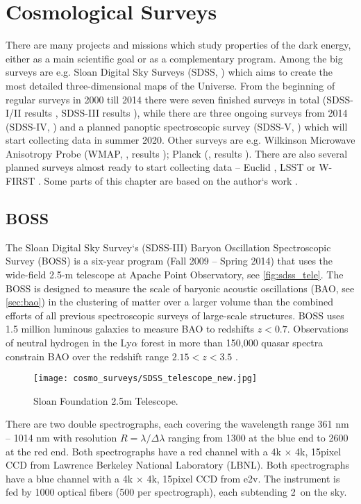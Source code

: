 \chapter{Cosmological Surveys}
\label{chpt:cosmo_surveys}
There are many projects and missions which study properties of the dark energy, either as a main scientific goal or as a complementary program. Among the big surveys are e.g. Sloan Digital Sky Surveys (SDSS, \cite{SDSS}) which aims to create the most detailed three-dimensional maps of the Universe. From the beginning of regular surveys in 2000 till 2014 there were seven finished surveys in total (SDSS-I/II results \cite{SDSS_I_II}, SDSS-III results \cite{BOSS_results}), while there are three ongoing surveys from 2014 (SDSS-IV, \cite{2017AJ....154...28B}) and a planned panoptic spectroscopic survey (SDSS-V, \cite{2017arXiv171103234K}) which will start collecting data in summer 2020. Other surveys are e.g. Wilkinson Microwave Anisotropy Probe (WMAP, \cite{WMAP}, results \cite{WMAP_results}); Planck (\cite{planck}, results \cite{planck_cosm}). There are also several planned surveys almost ready to start collecting data -- Euclid \parencite{euclid}, LSST \parencite{lsst} or W-FIRST \parencite{WFIRST_report}. Some parts of this chapter are based on the author`s work \textcite{mastersthesis_vrastil}.
\section{BOSS}
The Sloan Digital Sky Survey`s (SDSS-III) Baryon Oscillation Spectroscopic Survey (BOSS) is a six-year program (Fall 2009 -- Spring 2014)  that uses the wide-field 2.5-m telescope at Apache Point Observatory, see \autoref{fig:sdss_tele}. The BOSS is designed to measure the scale of baryonic acoustic oscillations (BAO, see \autoref{sec:bao}) in the clustering of matter over a larger volume than the combined efforts of all previous spectroscopic surveys of large-scale structures. BOSS uses 1.5 million luminous galaxies to measure BAO to redshifts $z<0.7$. Observations of neutral hydrogen in the Ly$\alpha$ forest in more than 150,000 quasar spectra constrain BAO over the redshift range $2.15 < z < 3.5$ \cite{BOSS}.
\begin{figure}[tb]
    \centering
    \texttt{[image: cosmo\_surveys/SDSS\_telescope\_new.jpg]}
    \caption{Sloan Foundation 2.5m Telescope.}
    \label{fig:sdss_tele}
\end{figure}

There are two double spectrographs, each covering the wavelength range 361 nm -- 1014 nm with resolution $R=\lambda/\Delta\lambda$ ranging from 1300 at the blue end to 2600 at the red end.  Both spectrographs have a red channel with a 4k $\times$ 4k, 15\um  pixel CCD from Lawrence Berkeley National Laboratory (LBNL). Both spectrographs have a blue channel with a 4k $\times$ 4k, 15\um  pixel CCD from  e2v. The instrument is fed by 1000 optical fibers (500 per spectrograph), each subtending 2\arcsec\ on the sky.

